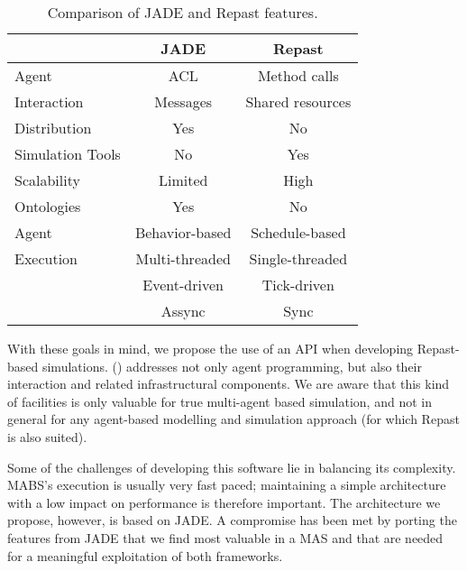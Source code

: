 \begin{table}[h]
	\normalsize
	\caption{Comparison of JADE and Repast features.}
	\label{tab:jadevsrep}
	\begin{center}
		\begin{tabular}{l|cc}
		\hline

		\hline
		\textbf{} & \textbf{JADE} & \textbf{Repast} \\ %
		\hline
			Agent 		& ACL  	&  Method calls  \\ %
			Interaction	& Messages	&  Shared resources \\
		\hline
			Distribution & Yes & No \\ %
		\hline
			Simulation Tools & No & Yes \\ %
		\hline
			Scalability & Limited & High \\ %
		\hline
			Ontologies & Yes & No \\ %
		\hline
			Agent  		& Behavior-based & Schedule-based  \\ %
			Execution	& Multi-threaded & Single-threaded \\ %
						& Event-driven   & Tick-driven 	   \\ %
						& Assync		 & Sync 		   \\ %
		\hline
		\end{tabular}
	\end{center}
\end{table} 

With these goals in mind, we propose the use of an API when developing Repast-based simulations. \apiname{} (\apilongname{}) addresses not only agent programming, but also their interaction and related infrastructural components.
We are aware that this kind of facilities is only valuable for true multi-agent based simulation, and not in general for any agent-based modelling and simulation approach (for which Repast is also suited).

Some of the challenges of developing this software lie in balancing its complexity.
MABS's execution is usually very fast paced; maintaining a simple architecture with a low impact on performance is therefore important.
The architecture we propose, however, is based on \gls{JADE}.
A compromise has been met by porting the features from \gls{JADE} that we find most valuable in a \gls{MAS} and that are needed for a meaningful exploitation of both frameworks.

